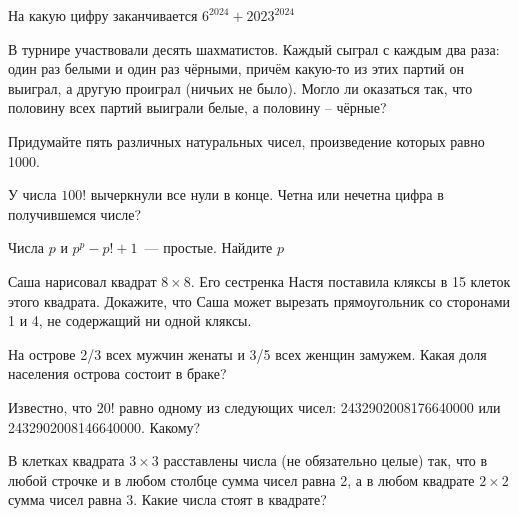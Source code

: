 \documentclass{article}
\begin{document}
\begin{enumerate_boxed}
        \item На какую цифру заканчивается $6^{2024} + 2023^{2024}$

        \item В турнире участвовали десять шахматистов.
        Каждый сыграл с каждым два раза: один раз белыми и один раз чёрными, причём какую-то из этих партий он выиграл, а другую проиграл (ничьих не было).
        Могло ли оказаться так, что половину всех партий выиграли белые, а половину – чёрные?

        \item Придумайте пять различных натуральных чисел, произведение которых равно 1000.

        \item У числа $100!$ вычеркнули все нули в конце.
        Четна или нечетна цифра в получившемся числе?

        \item Числа $p$ и $p^p - p! + 1$~--- простые.
        Найдите $p$

        \item Саша нарисовал квадрат $8\times 8$.
        Его сестренка Настя поставила кляксы в 15 клеток этого квадрата.
        Докажите, что Саша может вырезать прямоугольник со сторонами 1 и 4, не содержащий ни одной кляксы.

        \item На острове 2/3 всех мужчин женаты и 3/5 всех женщин замужем.
        Какая доля населения острова состоит в браке?

        \item Известно, что $20!$ равно одному из следующих чисел: 2432902008176640000 или 2432902008146640000.
        Какому?

        \item В клетках квадрата $3 \times 3$ расставлены числа (не обязательно целые) так, что в любой строчке и в любом столбце сумма чисел равна 2, а в любом квадрате $2 \times 2$ сумма чисел равна 3.
        Какие числа стоят в квадрате?


    \end{enumerate_boxed}
\end{document}
